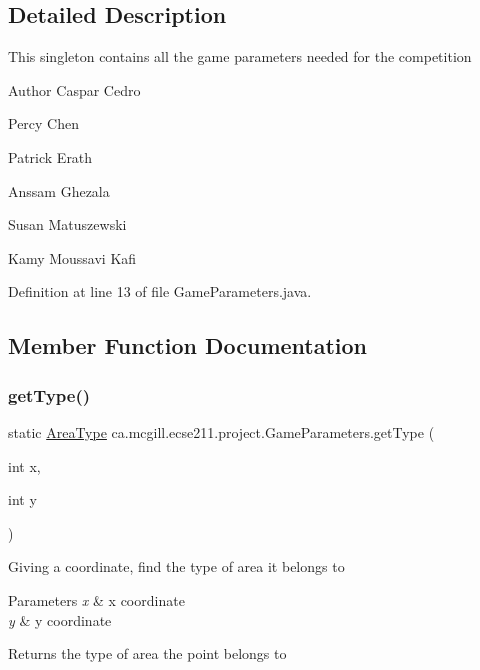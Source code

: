 \subsection{Detailed Description}
This singleton contains all the game parameters needed for the competition

\begin{DoxyAuthor}{Author}
Caspar Cedro 

Percy Chen 

Patrick Erath 

Anssam Ghezala 

Susan Matuszewski 

Kamy Moussavi Kafi 
\end{DoxyAuthor}


Definition at line 13 of file Game\+Parameters.\+java.



\subsection{Member Function Documentation}
\mbox{\label{enumca_1_1mcgill_1_1ecse211_1_1project_1_1_game_parameters_a4e7713b30588fc0b2af065db0b198b2c}} 
\subsubsection{\texorpdfstring{get\+Type()}{getType()}}
{\footnotesize\ttfamily static \hyperlink{enumca_1_1mcgill_1_1ecse211_1_1project_1_1_game_parameters_1_1_area_type}{Area\+Type} ca.\+mcgill.\+ecse211.\+project.\+Game\+Parameters.\+get\+Type (\begin{DoxyParamCaption}\item[{int}]{x,  }\item[{int}]{y }\end{DoxyParamCaption})\hspace{0.3cm}{\ttfamily [static]}}

Giving a coordinate, find the type of area it belongs to 
\begin{DoxyParams}{Parameters}
{\em x} & x coordinate \\
\hline
{\em y} & y coordinate \\
\hline
\end{DoxyParams}
\begin{DoxyReturn}{Returns}
the type of area the point belongs to 
\end{DoxyReturn}

